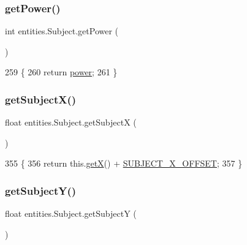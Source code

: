 \subsubsection{\texorpdfstring{get\+Power()}{getPower()}}
{\footnotesize\ttfamily int entities.\+Subject.\+get\+Power (\begin{DoxyParamCaption}{ }\end{DoxyParamCaption})\hspace{0.3cm}{\ttfamily [inline]}}


\begin{DoxyCode}
259                           \{
260         \textcolor{keywordflow}{return} \mbox{\hyperlink{classentities_1_1_subject_a7bd41d6fe9656de66d4a08c4a9565ec4}{power}};
261     \}
\end{DoxyCode}
\mbox{\label{classentities_1_1_subject_a6b019eb16c336f596c24aa9d6a102c39}} 
\subsubsection{\texorpdfstring{get\+Subject\+X()}{getSubjectX()}}
{\footnotesize\ttfamily float entities.\+Subject.\+get\+SubjectX (\begin{DoxyParamCaption}{ }\end{DoxyParamCaption})\hspace{0.3cm}{\ttfamily [inline]}}


\begin{DoxyCode}
355                                \{
356         \textcolor{keywordflow}{return} this.\mbox{\hyperlink{classorg_1_1newdawn_1_1slick_1_1geom_1_1_shape_a736a47bfdd6f164558b43fd497a3a3f3}{getX}}() + \mbox{\hyperlink{classentities_1_1_subject_aa14a4aa541d95d7219e27c4a522eabd5}{SUBJECT\_X\_OFFSET}};
357     \}
\end{DoxyCode}
\mbox{\label{classentities_1_1_subject_a0ce76d064a5b578263080e89e8990468}} 
\subsubsection{\texorpdfstring{get\+Subject\+Y()}{getSubjectY()}}
{\footnotesize\ttfamily float entities.\+Subject.\+get\+SubjectY (\begin{DoxyParamCaption}{ }\end{DoxyParamCaption})\hspace{0.3cm}{\ttfamily [inline]}}


